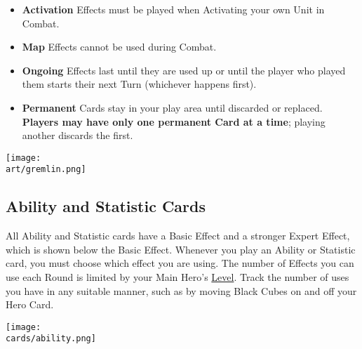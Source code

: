 \begin{multicols*}{2}
\begin{enumerate}
\begin{itemize}
    \item \textbf{Activation}  Effects must be played when Activating your own Unit in Combat.
    \item \textbf{Map}  Effects cannot be used during Combat.
    \item \textbf{Ongoing}  Effects last until they are used up or until the player who played them starts their next Turn (whichever happens first).
    \item \textbf{Permanent}  Cards stay in your play area until discarded or replaced.
      \textbf{Players may have only one permanent Card at a time}; playing another discards the first.
  \end{itemize}
\end{enumerate}

\vspace*{\fill}
\begin{center}
  \hspace{3em}
  \texttt{[image: \\art/gremlin.png]}
\end{center}

\clearpage

\subsection*{\hypertarget{Ability}{Ability and Statistic Cards}}

All Ability and Statistic cards have a Basic Effect and a stronger Expert  Effect, which is shown below the Basic Effect.
Whenever you play an Ability or Statistic card, you must choose which effect you are using.
The number of  Effects you can use each Round is limited by your Main Hero's \hyperlink{Level}{Level}.
Track the number of uses you have in any suitable manner, such as by moving Black Cubes on and off your Hero Card.\par
\bigskip

\texttt{[image: \\cards/ability.png]}



\end{multicols*}
